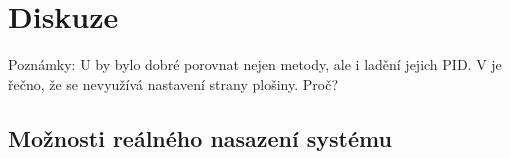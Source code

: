\chapter{Diskuze} \label{chap:discussion}

Poznámky:
U  by bylo dobré porovnat nejen metody, ale i ladění jejich PID.
V  je řečno, že se nevyužívá nastavení strany plošiny. Proč?

\section{Možnosti reálného nasazení systému}
